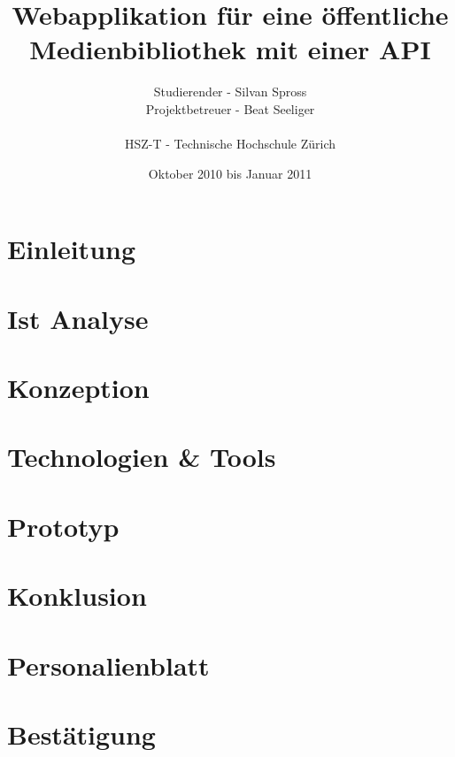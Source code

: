 \documentclass[abstracton,liststotoc,bibtotoc]{scrreprt}
\title{Webapplikation für eine öffentliche Medienbibliothek mit einer API}
\author{Studierender - Silvan Spross\\
    Projektbetreuer - Beat Seeliger\\
    \\
    HSZ-T - Technische Hochschule Zürich}
\date{Oktober 2010 bis Januar 2011}
\begin{document}
    \ifpdf
    \else
    \fi
    

    \maketitle
    
    
    

    \tableofcontents
    
    \clearpage

    \chapter{Einleitung}
    
    
    \chapter{Ist Analyse}
    
    
    \chapter{Konzeption}
    
    
    \chapter{Technologien \& Tools}
    
    
    \chapter{Prototyp}
    
    
    \chapter{Konklusion}
    
    
    \appendix
    
    \chapter{Personalienblatt}
    
    
    \chapter{Bestätigung}
    
    
    \listoffigures

    \listoftables
    
    
    
    
\end{document}
